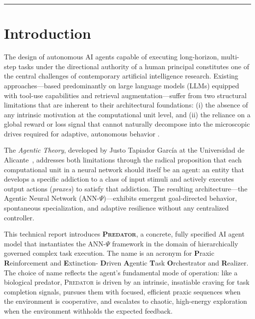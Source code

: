 \documentclass[12pt,a4paper]{article}
\newcommand{\PREDATOR}{\textsc{Predator}}
\begin{document}
\vspace{1em}
{\color{predred}\rule{\linewidth}{0.6pt}}

\newpage
\tableofcontents
\newpage

\section{Introduction}

The design of autonomous AI agents capable of executing long-horizon,
multi-step tasks under the directional authority of a human principal
constitutes one of the central challenges of contemporary artificial
intelligence research. Existing approaches---based predominantly on large
language models (LLMs) equipped with tool-use capabilities and retrieval
augmentation---suffer from two structural limitations that are inherent to
their architectural foundations: (i) the absence of any intrinsic motivation
at the computational unit level, and (ii) the reliance on a global reward or
loss signal that cannot naturally decompose into the microscopic drives
required for adaptive, autonomous behavior \cite{lecun2015deep,
vaswani2017attention, openai2023gpt4}.

The \textit{Agentic Theory}, developed by Justo Tapiador Garc\'ia at the
Universidad de Alicante~\cite{tapiador2024ajn, tapiador2024annpsi,
tapiador2024daf}, addresses both limitations through the radical proposition
that each computational unit in a neural network should itself be an agent:
an entity that develops a specific addiction to a class of input stimuli and
actively executes output actions (\textit{praxes}) to satisfy that addiction.
The resulting architecture---the Agentic Neural Network (ANN-$\Psi$)---exhibits
emergent goal-directed behavior, spontaneous specialization, and adaptive
resilience without any centralized controller.

This technical report introduces \textbf{\PREDATOR}, a concrete, fully
specified AI agent model that instantiates the ANN-$\Psi$ framework in the
domain of hierarchically governed complex task execution. The name is an
acronym for \textbf{P}raxic \textbf{R}einforcement and \textbf{E}xtinction-%
\textbf{D}riven \textbf{A}gentic \textbf{T}ask \textbf{O}rchestrator and
\textbf{R}ealizer. The choice of name reflects the agent's fundamental
mode of operation: like a biological predator, \PREDATOR{} is driven by an
intrinsic, insatiable craving for task completion signals, pursues them with
focused, efficient praxic sequences when the environment is cooperative, and
escalates to chaotic, high-energy exploration when the environment withholds
the expected feedback.
\end{document}
